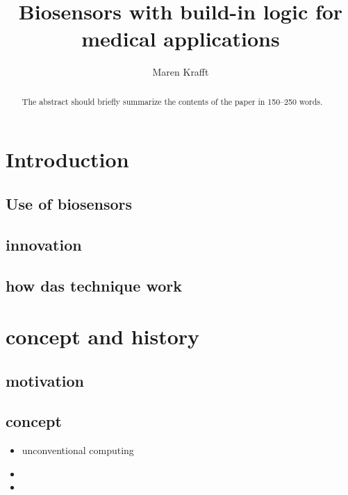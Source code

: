 \documentclass[runningheads]{llncs}
\begin{document}
\title{Biosensors with build-in logic for medical applications}
\author{Maren Krafft}
\maketitle        

      
\begin{abstract}
	
The abstract should briefly summarize the contents of the paper in
150--250 words.



\end{abstract}

\section{Introduction}
\subsection{Use of biosensors}
\subsection{innovation}
\subsection{how das technique work}

\section{concept and history}
\subsection{motivation}
\subsection{concept}
	\begin{itemize}
		\item unconventional computing
		\item 
		\item
	\end{itemize}
\end{document}
